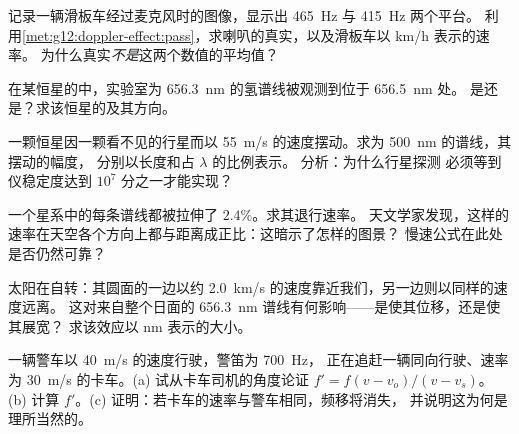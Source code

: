 \begin{exercise}[$\star\star$]\label{exo:g12:doppler-effect:10}
记录一辆滑板车经过麦克风时的图像，显示出 \qty{465}{Hz} 与 \qty{415}{Hz} 两个平台。
利用\cref{met:g12:doppler-effect:pass}，求喇叭的真实，以及滑板车以 \unit{km/h} 表示的速率。
为什么真实\emph{不是}这两个数值的平均值？
\end{exercise}

\begin{exercise}[$\star\star$]\label{exo:g12:doppler-effect:11}
在某恒星的中，实验室为 \qty{656.3}{nm} 的氢谱线被观测到位于 \qty{656.5}{nm} 处。
是还是？求该恒星的及其方向。
\end{exercise}

\begin{exercise}[$\star\star\star$]\label{exo:g12:doppler-effect:12}
一颗恒星因一颗看不见的行星而以 \qty{55}{m/s} 的速度摆动。求为 \qty{500}{nm} 的谱线，其摆动的幅度，
分别以长度和占 $\lambda$ 的比例表示。
分析：为什么行星探测
必须等到仪稳定度达到 $10^{7}$ 分之一才能实现？
\end{exercise}

\begin{exercise}[$\star\star\star$]\label{exo:g12:doppler-effect:13}
一个星系中的每条谱线都被拉伸了 $2.4\%$。求其退行速率。
天文学家发现，这样的速率在天空各个方向上都与距离成正比：这暗示了怎样的图景？
慢速公式在此处是否仍然可靠？
\end{exercise}

\begin{exercise}[$\star\star\star$]\label{exo:g12:doppler-effect:14}
太阳在自转：其圆面的一边以约 \qty{2.0}{km/s} 的速度靠近我们，另一边则以同样的速度远离。
这对来自整个日面的 \qty{656.3}{nm} 谱线有何影响——是使其位移，还是使其展宽？
求该效应以 \unit{nm} 表示的大小。
\end{exercise}

\begin{exercise}[$\star\star\star$]\label{exo:g12:doppler-effect:15}
一辆警车以 \qty{40}{m/s} 的速度行驶，警笛为 \qty{700}{Hz}，
正在追赶一辆同向行驶、速率为 \qty{30}{m/s} 的卡车。(a) 试从卡车司机的角度论证 $f' = f(v - v_o)/(v - v_s)$。
(b) 计算 $f'$。(c) 证明：若卡车的速率与警车相同，频移将消失，
并说明这为何是理所当然的。
\end{exercise}

